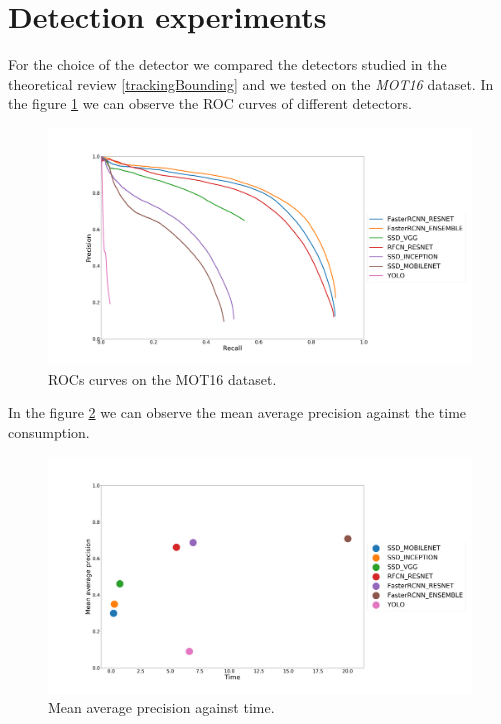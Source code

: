 \section{Detection experiments}\label{valdiation:det}


For the choice of the detector we compared the detectors studied in the theoretical review \ref{trackingBounding} and we tested on the \textit{MOT16} dataset. In the figure \ref{experimDet1} we can observe the ROC curves of different detectors.



\begin{figure}[H]
\centering         
\includegraphics[width=0.9\linewidth]{evaluacionObject/dadas.png}
\caption{ROCs curves on the MOT16 dataset.} \label{experimDet1}
\end{figure}

In the figure \ref{experimDet2} we can observe the mean average precision against the time consumption.


\begin{figure}[H]
\centering         
\includegraphics[width=0.9\linewidth]{evaluacionObject/meanAverage2.png}
\caption{Mean average precision against time.} \label{experimDet2}
\end{figure}

